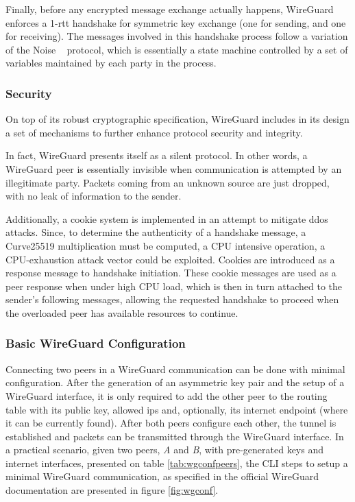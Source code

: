 \documentclass[11pt,twoside,a4paper]{report}
\begin{document}
Finally, before any encrypted message exchange actually happens, WireGuard enforces a 1-\ac{rtt} handshake for symmetric key exchange (one for sending, and one for receiving). The messages involved in this handshake process follow a variation of the Noise ~\cite{perrin2018noise} protocol, which is essentially a state machine controlled by a set of variables maintained by each party in the process.

\subsubsection{Security}

On top of its robust cryptographic specification, WireGuard includes in its design a set of mechanisms to further enhance protocol security and integrity.

In fact, WireGuard presents itself as a silent protocol. In other words, a WireGuard peer is essentially invisible when communication is attempted by an illegitimate party. Packets coming from an unknown source are just dropped, with no leak of information to the sender.

Additionally, a cookie system is implemented in an attempt to mitigate \ac{ddos} attacks. Since, to determine the authenticity of a handshake message, a Curve25519 multiplication must be computed, a CPU intensive operation, a CPU-exhaustion attack vector could be exploited. Cookies are introduced as a response message to handshake initiation. These cookie messages are used as a peer response when under high CPU load, which is then in turn attached to the sender's following messages, allowing the requested handshake to proceed when the overloaded peer has available resources to continue.


\subsubsection{Basic WireGuard Configuration}

Connecting two peers in a WireGuard communication can be done with minimal configuration. After the generation of an asymmetric key pair and the setup of a WireGuard interface, it is only required to add the other peer to the routing table with its public key, allowed \ac{ip}s and, optionally, its internet endpoint (where it can be currently found). After both peers configure each other, the tunnel is established and packets can be transmitted through the WireGuard interface.
In a practical scenario, given two peers, \emph{A} and \emph{B}, with pre-generated keys and internet interfaces, presented on table \ref{tab:wgconfpeers}, the CLI steps to setup a minimal WireGuard communication, as specified in the official WireGuard documentation are presented in figure \ref{fig:wgconf}.
\end{document}
